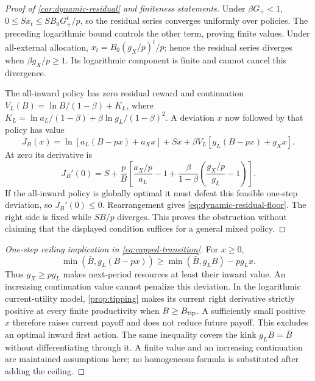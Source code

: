 \documentclass[11pt,a4paper]{article}
\theoremstyle{definition}\newtheorem{definition}{Definition}
\begin{document}
\begin{proof}[Proof of \cref{cor:dynamic-residual} and finiteness statements]
Under $\beta G_+<1$, $0\leq Sx_t\leq SB_0G_+^t/p$, so the residual
series converges uniformly over policies. The preceding logarithmic bound
controls the other term, proving finite values. Under all-external
allocation, $x_t=B_0(g_X/p)^t/p$; hence the residual series diverges
when $\beta g_X/p\geq1$. Its logarithmic component is finite and cannot
cancel this divergence.

The all-inward policy has zero residual reward and continuation
$V_L(B)=\ln B/(1-\beta)+K_L$, where
$K_L=\ln a_L/(1-\beta)+\beta\ln g_L/(1-\beta)^2$.
A deviation $x$ now followed by that policy has value
\[
 J_B(x)=\ln[a_L(B-px)+a_Xx]+Sx
       +\beta V_L[g_L(B-px)+g_Xx].
\]
At zero its derivative is
\[
 J_B'(0)=S+\frac pB\left[
 \frac{a_X/p}{a_L}-1+
 \frac\beta{1-\beta}\left(\frac{g_X/p}{g_L}-1\right)\right].
\]
If the all-inward policy is globally optimal it must defeat this feasible
one-step deviation, so $J_B'(0)\leq0$. Rearrangement gives
\cref{eq:dynamic-residual-floor}. The right side is fixed while $SB/p$
diverges. This proves the obstruction without claiming that the displayed
condition suffices for a general mixed policy.
\end{proof}

\begin{proof}[One-step ceiling implication in \cref{eq:capped-transition}]
For $x\geq0$,
\[
 \min(\bar B,g_L(B-px))\geq\min(\bar B,g_LB)-pg_Lx.
\]
Thus $g_X\geq pg_L$ makes next-period resources at least their inward
value. An increasing continuation value cannot penalize this deviation.
In the logarithmic current-utility model, \cref{prop:tipping} makes its
current right derivative strictly positive at every finite productivity
when $B\geq B_{\rm tip}$. A sufficiently small positive $x$ therefore
raises current payoff and does not reduce future payoff. This excludes an
optimal inward first action. The same inequality covers the kink
$g_LB=\bar B$ without differentiating through it. A finite value and an
increasing continuation are maintained assumptions here; no homogeneous
formula is substituted after adding the ceiling.
\end{proof}
\end{document}
